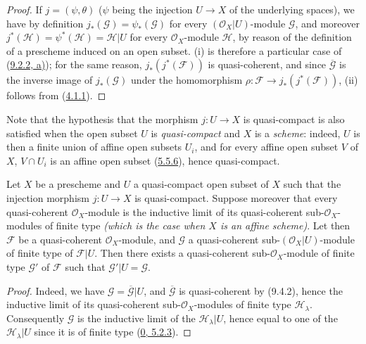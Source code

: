 \begin{proof}
If $j=(\psi,\theta)$ ($\psi$ being the injection $U\to X$ of the
underlying spaces), we have by definition $j_*(\mathscr{G})=\psi_*(\mathscr{G})$
for every $(\mathscr{O}_X|U)$-module $\mathscr{G}$, and moreover
$j^*(\mathscr{H})=\psi^*(\mathscr{H})=\mathscr{H}|U$ for every
$\mathscr{O}_X$-module $\mathscr{H}$, by reason of the definition of a
prescheme induced on an open subset. (i) is therefore a particular case of
(\hyperref[I.9.2.2]{9.2.2, a)}); for the same reason,
$j_*(j^*(\mathscr{F}))$ is quasi-coherent, and since
$\overline{\mathscr{G}}$ is the inverse image of $j_*(\mathscr{G})$ under
the homomorphism $\rho:\mathscr{F}\to j_*(j^*(\mathscr{F}))$, (ii) follows
from (\hyperref[I.4.1.1]{4.1.1}).
\end{proof}

Note that the hypothesis that the morphism $j:U\to X$ is quasi-compact is
also satisfied when the open subset $U$ is \emph{quasi-compact} and $X$ is a
\emph{scheme}: indeed, $U$ is then a finite union of affine open subsets
$U_i$, and for every affine open subset $V$ of $X$, $V\cap U_i$ is an affine
open subset (\hyperref[I.5.5.6]{5.5.6}), hence quasi-compact.

\begin{corollary}[9.4.3]
\label{I.9.4.3}
Let $X$ be a prescheme and $U$ a quasi-compact open subset of $X$ such that
the injection morphism $j:U\to X$ is quasi-compact. Suppose moreover that
every quasi-coherent $\mathscr{O}_X$-module is the inductive limit of its
quasi-coherent sub-$\mathscr{O}_X$-modules of finite type
\emph{(which is the case when $X$ is an \emph{affine scheme})}. Let then
$\mathscr{F}$ be a quasi-coherent $\mathscr{O}_X$-module, and $\mathscr{G}$
a quasi-coherent sub-$(\mathscr{O}_X|U)$-module of finite type of
$\mathscr{F}|U$. Then there exists a quasi-coherent
sub-$\mathscr{O}_X$-module of finite type $\mathscr{G}'$ of $\mathscr{F}$
such that $\mathscr{G}'|U=\mathscr{G}$.
\end{corollary}

\begin{proof}
Indeed, we have $\mathscr{G}=\overline{\mathscr{G}}|U$, and
$\overline{\mathscr{G}}$ is quasi-coherent by (9.4.2), hence the inductive
limit of its quasi-coherent sub-$\mathscr{O}_X$-modules of finite type
$\mathscr{H}_\lambda$. Consequently $\mathscr{G}$ is the inductive limit of
the $\mathscr{H}_\lambda|U$, hence equal to one of the
$\mathscr{H}_\lambda|U$ since it is of finite type
(\hyperref[0.5.2.3]{0, 5.2.3}).
\end{proof}

